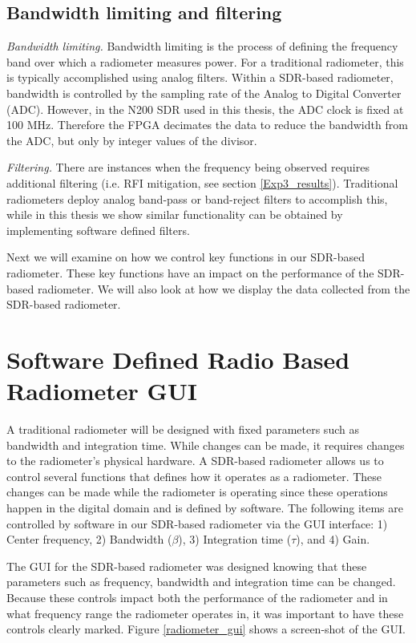 \subsection{Bandwidth limiting and filtering}

\emph{Bandwidth limiting.}  Bandwidth limiting is the process of defining the frequency band over which a radiometer measures power.  For a traditional radiometer, this is typically accomplished using analog filters.  Within a SDR-based radiometer, bandwidth is controlled by the sampling rate of the Analog to Digital Converter (ADC).  However, in the N200 SDR used in this thesis, the ADC clock is fixed at 100 MHz.  Therefore the FPGA decimates the data to reduce the bandwidth from the ADC, but only by integer values of the divisor.

\emph{Filtering.}  There are instances when the frequency being observed requires additional filtering (i.e. RFI mitigation, see section \ref{Exp3_results}).  Traditional radiometers deploy analog band-pass or band-reject filters to accomplish this, while in this thesis we show similar functionality can be obtained by implementing software defined filters.

Next we will examine on how we control key functions in our SDR-based radiometer.  These key functions have an impact on the performance of the SDR-based radiometer.  We will also look at how we display the data collected from the SDR-based radiometer.

\section{Software Defined Radio Based Radiometer GUI}

A traditional radiometer will be designed with fixed parameters such as bandwidth and integration time.  While changes can be made, it requires changes to the radiometer's physical hardware.  A SDR-based radiometer allows us to control several functions that defines how it operates as a radiometer.  These changes can be made while the radiometer is operating since these operations happen in the digital domain and is defined by software. The following items are controlled by software in our SDR-based radiometer via the GUI interface: 1) Center frequency, 2) Bandwidth ($\beta$), 3) Integration time ($\tau$), and 4) Gain.

The GUI for the SDR-based radiometer was designed knowing that these parameters such as frequency, bandwidth and integration time can be changed.  Because these controls impact both the performance of the radiometer and in what frequency range the radiometer operates in, it was important to have these controls clearly marked.  Figure \ref{radiometer_gui} shows a screen-shot of the GUI.

